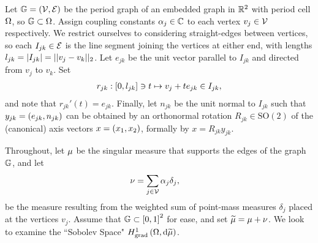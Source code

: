 \documentclass[11pt]{report}
\begin{document}
\begin{assumption} \label{ass:MeasTheoryProblemSetup}
	Let $\mathbb{G}=\left( \mathcal{V},\mathcal{E} \right)$ be the period graph of an embedded graph in $\mathbb{R}^2$ with period cell $\Omega$, so $\mathbb{G}\subset\Omega$.
	Assign coupling constants $\alpha_j\in\mathbb{C}$ to each vertex $v_j\in\mathcal{V}$ respectively.
	We restrict ourselves to considering straight-edges between vertices, so each $I_{jk}\in \mathcal{E}$ is the line segment joining the vertices at either end, with lengths $l_{jk} = \left\lvert I_{jk} \right\rvert = \lvert\lvert v_j-v_k \rvert\rvert_2$.
	Let $e_{jk}$ be the unit vector parallel to $I_{jk}$ and directed from $v_j$ to $v_k$.
	Set
	\begin{align} \label{eq:EdgeParameterisation}
	r_{jk}:\left[ 0, l_{jk} \right] \ni t \mapsto v_j + te_{jk} \in I_{jk},
	\end{align}
	and note that $r_{jk}'(t) = e_{jk}$.
	Finally, let $n_{jk}$ be the unit normal to $I_{jk}$ such that $y_{jk} = \left( e_{jk}, n_{jk} \right)$ can be obtained by an orthonormal rotation $R_{jk}\in\mathrm{SO}(2)$ of the (canonical) axis vectors $x = \left( x_1, x_2 \right)$, formally by $x = R_{jk}y_{jk}$.
\end{assumption}

Throughout, let $\mu$ be the singular measure that supports the edges of the graph $\mathbb{G}$, and let
\begin{align*}
	\nu &= \sum_{j\in\mathcal{V}} \alpha_j\delta_{j},
\end{align*}
be the measure resulting from the weighted sum of point-mass measures $\delta_j$ placed at the vertices $v_j$.
Assume that $\mathbb{G}\subset\left[ 0,1 \right]^2$ for ease, and set $\widetilde{\mu} = \mu + \nu$.
We look to examine the ``Sobolev Space" $H^1_\mathrm{grad}\left( \Omega, \mathrm{d}\widetilde{\mu} \right)$.
\end{document}
